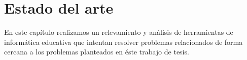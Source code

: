 \chapter{Estado del arte} %
En este capítulo realizamos un relevamiento y análisis de herramientas de informática educativa que intentan resolver problemas relacionados de forma cercana a los problemas planteados en éste trabajo de tesis.

\label{capitulo3} %




